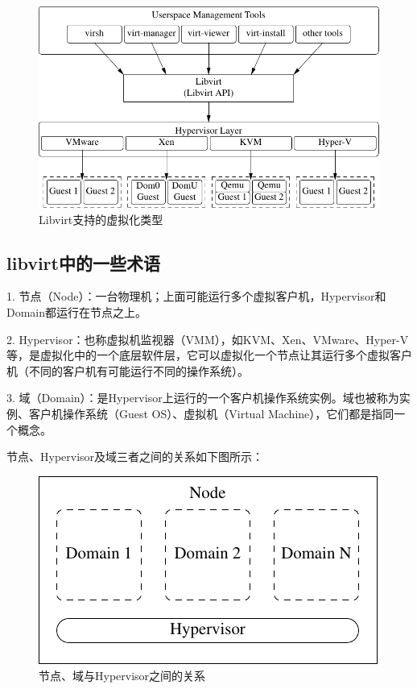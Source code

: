 \begin{figure}[ht]
  \centering
  \includegraphics{graph/libvirt_support.pdf}
  \caption{\label{fig:libvirtSupport} Libvirt支持的虚拟化类型}
\end{figure}

\subsection{libvirt中的一些术语}
\label{sec:libvirtTerm}

1. 节点（Node）：一台物理机；上面可能运行多个虚拟客户机，Hypervisor和Domain都运行在节点之上。

2. Hypervisor：也称虚拟机监视器（VMM），如KVM、Xen、VMware、Hyper-V等，是虚拟化中的一个底层软件层，它可以虚拟化一个节点让其运行多个虚拟客户机（不同的客户机有可能运行不同的操作系统）。

3. 域（Domain）：是Hypervisor上运行的一个客户机操作系统实例。域也被称为实例、客户机操作系统（Guest OS）、虚拟机（Virtual Machine），它们都是指同一个概念。

节点、Hypervisor及域三者之间的关系如下图所示：

\begin{figure}[htbp]
  \centering
  \includegraphics{graph/libvirt_node_hypervisor_domain.pdf}
  \caption{\label{fig:libvirtNodeHyperDomain} 节点、域与Hypervisor之间的关系}
\end{figure}

